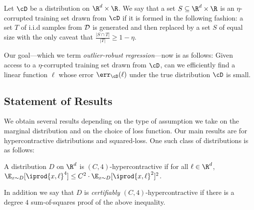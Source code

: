 \begin{definition}
Let $\cD$ be a distribution on $\R^d \times \R$. We say that a set $S \subseteq \R^d \times \R$ is an $\eta$-corrupted training set drawn from $\cD$ if it is formed in the
following fashion: a set $T$ of i.i.d samples from ${\cal D}$ is generated and then replaced by a set $S$ of equal size with the only caveat that
$\frac{|S \cap T|}{|T|} \geq 1 - \eta$.
\end{definition}

Our goal---which we term \emph{outlier-robust regression}---now is as follows: Given access to a $\eta$-corrupted training set drawn from $\cD$, can we efficiently find a linear function $\ell$ whose error $\err_{\cD}(\ell)$ under the true distribution $\cD$ is small. 



\subsection{Statement of Results}
We obtain several results depending on the type of assumption we take
on the marginal distribution and on the choice of loss function. Our main results are for hypercontractive distributions and squared-loss. One such class of distributions is as follows:
\begin{definition}[$4$-Hypercontractivity]
A distribution $D$ on $\R^d$ is $(C,4)$-hypercontractive if for all $\ell \in \R^d$, $\E_{x \sim D}[\iprod{x,\ell}^4] \leq C^2 \cdot \E_{x \sim D}[\iprod{x,\ell}^2]^2$. 

In addition we say that $D$ is \emph{certifiably} $(C,4)$-hypercontractive if there is a degree $4$ sum-of-squares proof of the above inequality.
\end{definition}

